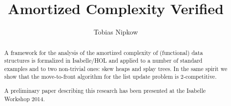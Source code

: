 \documentclass[11pt,a4paper]{article}
\begin{document}
\title{Amortized Complexity Verified}
\author{Tobias Nipkow}
\maketitle

\begin{abstract}
  A framework for the analysis of the amortized complexity of (functional)
  data structures is formalized in Isabelle/HOL and applied to a number of
  standard examples and to two non-trivial ones: skew heaps and splay trees.
  In the same spirit we show that the move-to-front algorithm for the list
  update problem is 2-competitive.

A preliminary paper describing this research has been presented at the
Isabelle Workshop 2014.
\end{abstract}

\setcounter{tocdepth}{2}
\tableofcontents
\newpage





\end{document}
